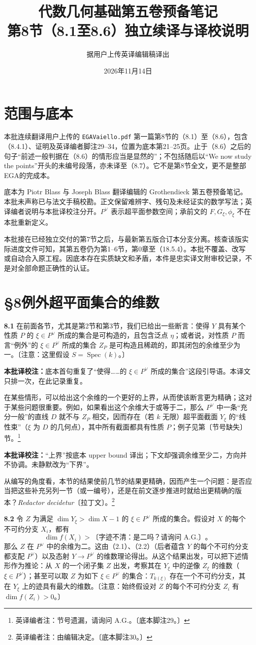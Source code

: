 \documentclass{ctexbook}
\title{代数几何基础第五卷预备笔记\\第8节（8.1至8.6）独立续译与译校说明}
\author{据用户上传英译编辑稿译出}
\date{2026年11月14日}
\newcommand{\Spec}{\operatorname{Spec}}
\newcommand{\ednote}[1]{\footnote{英译编者注：#1}}
\newcommand{\tnote}[1]{\par\smallskip\noindent\textbf{本批译校注：}#1\par\smallskip}
\newcommand{\entry}[2]{\par\bigskip\noindent\textbf{#1\quad #2}\quad}
\begin{document}
\maketitle
\frontmatter
\chapter*{范围与底本}
本批连续翻译用户上传的 \texttt{EGAVaiello.pdf} 第一篇第8节的（8.1）至（8.6），包含（8.4.1）、证明及英译编者脚注29--34，位置为底本第21--25页。止于（8.6）之后的句子“前述一般判据在（8.6）的情形应当是显然的”；不包括随后以“We now study the points”开头的未编号段落，亦未译至（8.7）。它不是第8节全文，更不是整部EGA的完成本。

底本为 Piotr Blass 与 Joseph Blass 翻译编辑的 Grothendieck 第五卷预备笔记。本批未声称已与法文手稿校勘。正文保留难辨字、残句及未经证实的数学写法；英译编者说明与本批译校注分开。$P^\vee$ 表示超平面参数空间；承前文的 $F,G_\xi,\phi_\xi$ 不在本批重新定义。

本批接在已经独立交付的第7节之后，与最新第五版合订本分支分离。核查该版实际进度文件可知，其第五卷仍为第1--6节，第0章至（18.5.4）。本批不覆盖、改写或自动合入原工程。因底本存在实质缺文和矛盾，本件是忠实译文附审校记录，不是对全部命题正确性的认证。
\mainmatter
\chapter*{§8\quad 例外超平面集合的维数}
\entry{8.1}{}
在前面各节，尤其是第2节和第3节，我们已给出一些断言：使得 $Y$ 具有某个性质 $P$ 的 $\xi\in P^\vee$ 所成的集合是可构造的，且包含泛点 $\eta$；或者说，对性质 $P$ 而言“例外”的 $\xi\in P^\vee$ 所成的集合 $Z_P$ 是可构造且稀疏的，即其闭包的余维至少为一。〔注意：这里假设 $S=\Spec(k)$。〕
\tnote{底本首句重复了“使得……的 $\xi\in P^\vee$ 所成的集合”这段引导语。本译文只排一次，在此记录重复。}
在某些情形，可以给出这个余维的一个更好的上界，从而使该断言更为精确；这对于某些问题很重要。例如，如果看出这个余维大于或等于二，那么 $P^\vee$ 中一条“充分一般”的直线 $D$ 就不与 $Z_P$ 相交，因而存在（若 $k$ 无限）超平面截面 $Y_\xi$ 的“线性束”（$\xi$ 为 $D$ 的几何点），其中所有截面都具有性质 $P$；例子见第〔节号缺失〕节。\ednote{节号遗漏，请询问 A.G.。〔底本脚注29。〕}
\tnote{“上界”按底本 upper bound 译出；下文却强调余维至少二，方向并不协调。未静默改为“下界”。}
从编写的角度看，本节的结果使前几节的结果更精确，因而产生一个问题：是否应当把这些补充另列一节（或一编号），还是在前文逐步推进时就给出更精确的版本？\textit{Redactor decidetur}〔拉丁文〕。\ednote{由编辑决定。〔底本脚注30。〕}

\entry{8.2}{}
令 $Z$ 为满足 $\dim Y_\xi>\dim X-1$ 的 $\xi\in P^\vee$ 所成的集合。假设对 $X$ 的每个不可约分支 $X_i$，都有
\[
\dim f(X_i)>\text{〔字迹不清：是二吗？请询问 A.G.〕}\text{。}
\]
那么 $Z$ 在 $P^\vee$ 中的余维为二。这由（2.1）、（2.2）（后者蕴含 $Y$ 的每个不可约分支都支配 $P^\vee$）以及态射 $Y\to P^\vee$ 的维数理论得出。从这个结果出发，可以把下述情形作为推论：从 $X$ 的一个闭子集 $Z$ 出发，考察其在 $Y_\xi$ 中的逆像 $Z_\xi$ 的维数（$\xi\in P^\vee$）；甚至可以取 $Z$ 为如下 $\xi\in P^\vee$ 的集合：$T_{k(\xi)}$ 存在一个不可约分支，其在 $Y_\xi$ 上的迹具有最大的维数。〔注意：始终假设对 $Z$ 的每个不可约分支 $Z_i$ 有 $\dim f(Z_i)>0$。〕
\end{document}
